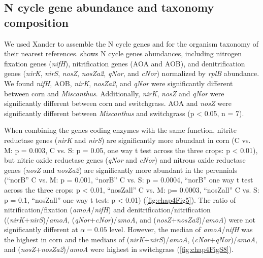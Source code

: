 \documentclass[]{msu-thesis}
\begin{document}
\subsection{N cycle gene abundance and taxonomy composition}
We used Xander \cite{wang_xander:_2015} to assemble the N cycle genes
and for the organism taxonomy of their nearest references.
 shows N cycle genes abundances, including nitrogen
fixation genes (\textit{nifH}), nitrification genes (AOA and AOB), and
denitrification genes (\textit{nirK}, \textit{nirS}, \textit{nosZ},
\textit{nosZa2}, \textit{qNor}, and \textit{cNor}) normalized by
\textit{rplB} abundance.  We found \textit{nifH}, AOB, \textit{nirK},
\textit{nosZa2}, and \textit{qNor} were significantly different between
corn and \textit{Miscanthus}.  Additionally, \textit{nirK},
\textit{nosZ} and \textit{qNor} were significantly different between
corn and switchgrass.  AOA and \textit{nosZ} were significantly
different between \textit{Miscanthus} and switchgrass (p < 0.05, n = 7).

When combining the genes coding enzymes with the same function, nitrite
reductase genes (\textit{nirK} and \textit{nirS}) are significantly more
abundant in corn (C vs. M: p = 0.003, C vs. S: p = 0.05, one way t test
across the three crops: p < 0.01), but nitric oxide reductase genes
(\textit{qNor} and \textit{cNor}) and nitrous oxide reductase genes
(\textit{nosZ} and \textit{nosZa2}) are significantly more abundant in
the perennials (``norB'' C vs. M: p = 0.001, ``norB'' C vs. S: p =
0.0004, ``norB'' one way t test across the three crops: p < 0.01,
``nosZall'' C vs. M: p= 0.0003, ``nosZall'' C vs. S: p = 0.1,
``nosZall'' one way t test: p < 0.01) (\cref{fig:chap4Fig5}). The ratio
of nitrification/fixation (\textit{amoA}/\textit{nifH}) and
denitrification/nitrification
((\textit{nirK}+\textit{nirS})/\textit{amoA},
(\textit{qNor}+\textit{cNor})/\textit{amoA}, and
(\textit{nosZ}+\textit{nosZa2})/\textit{amoA}) were not significantly
different at $\alpha = 0.05$ level. However, the median of
\textit{amoA}/\textit{nifH} was the highest in corn and the medians of
(\textit{nirK}+\textit{nirS})/\textit{amoA},
(\textit{cNor}+\textit{qNor})/\textit{amoA}, and
(\textit{nosZ}+\textit{nosZa2})/\textit{amoA} were highest in
switchgrass (\cref{fig:chap4FigS8}).
\end{document}
